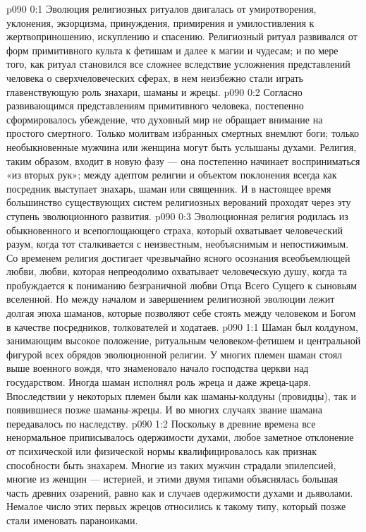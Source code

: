 \author{Мелхиседек}
\vs p090 0:1 Эволюция религиозных ритуалов двигалась от умиротворения, уклонения, экзорцизма, принуждения, примирения и умилостивления к жертвоприношению, искуплению и спасению. Религиозный ритуал развивался от форм примитивного культа к фетишам и далее к магии и чудесам; и по мере того, как ритуал становился все сложнее вследствие усложнения представлений человека о сверхчеловеческих сферах, в нем неизбежно стали играть главенствующую роль знахари, шаманы и жрецы.
\vs p090 0:2 Согласно развивающимся представлениям примитивного человека, постепенно сформировалось убеждение, что духовный мир не обращает внимание на простого смертного. Только молитвам избранных смертных внемлют боги; только необыкновенные мужчина или женщина могут быть услышаны духами. Религия, таким образом, входит в новую фазу --- она постепенно начинает восприниматься «из вторых рук»; между адептом религии и объектом поклонения всегда как посредник выступает знахарь, шаман или священник. И в настоящее время большинство существующих систем религиозных верований проходят через эту ступень эволюционного развития.
\vs p090 0:3 Эволюционная религия родилась из обыкновенного и всепоглощающего страха, который охватывает человеческий разум, когда тот сталкивается с неизвестным, необъяснимым и непостижимым. Со временем религия достигает чрезвычайно ясного осознания всеобъемлющей любви, любви, которая непреодолимо охватывает человеческую душу, когда та пробуждается к пониманию безграничной любви Отца Всего Сущего к сыновьям вселенной. Но между началом и завершением религиозной эволюции лежит долгая эпоха шаманов, которые позволяют себе стоять между человеком и Богом в качестве посредников, толкователей и ходатаев.
\vs p090 1:1 Шаман был колдуном, занимающим высокое положение, ритуальным человеком\hyp{}фетишем и центральной фигурой всех обрядов эволюционной религии. У многих племен шаман стоял выше военного вождя, что знаменовало начало господства церкви над государством. Иногда шаман исполнял роль жреца и даже жреца\hyp{}царя. Впоследствии у некоторых племен были как шаманы\hyp{}колдуны (провидцы), так и появившиеся позже шаманы\hyp{}жрецы. И во многих случаях звание шамана передавалось по наследству.
\vs p090 1:2 Поскольку в древние времена все ненормальное приписывалось одержимости духами, любое заметное отклонение от психической или физической нормы квалифицировалось как признак способности быть знахарем. Многие из таких мужчин страдали эпилепсией, многие из женщин --- истерией, и этими двумя типами объяснялась большая часть древних озарений, равно как и случаев одержимости духами и дьяволами. Немалое число этих первых жрецов относились к такому типу, который позже стали именовать параноиками.
